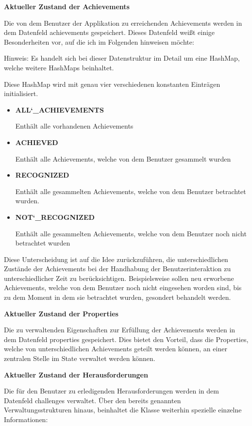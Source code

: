 \documentclass[bibliography=totoc,listof=totoc,BCOR=5mm,DIV=12,oneside]{scrbook}
\begin{document}
\newpage
\par \bigskip \textbf{Aktueller Zustand der Achievements}
\par Die von dem Benutzer der Applikation zu erreichenden Achievements werden in dem Datenfeld achievements gespeichert. Dieses Datenfeld weißt einige Besonderheiten vor, auf die ich im Folgenden hinweisen möchte:
\par \medskip Hinweis: Es handelt sich bei dieser Datenstruktur im Detail um eine HashMap, welche weitere HashMaps beinhaltet. 
\par \medskip Diese HashMap wird mit genau vier verschiedenen konstanten Einträgen initialisiert.
\begin{itemize}
\item \textbf{ALL\char`_ACHIEVEMENTS}
\par Enthält alle vorhandenen Achievements
\item \textbf{ACHIEVED}
\par Enthält alle Achievements, welche von dem Benutzer gesammelt wurden
\item \textbf{RECOGNIZED}
\par Enthält alle gesammelten Achievements, welche von dem Benutzer betrachtet wurden.
\item \textbf{NOT\char`_RECOGNIZED}
\par Enthält alle gesammelten Achievements, welche von dem Benutzer noch nicht betrachtet wurden
\end{itemize}

\par Diese Unterscheidung ist auf die Idee zurückzuführen, die unterschiedlichen Zustände der Achievements bei der Handhabung der Benutzerinteraktion zu unterschiedlicher Zeit zu berücksichtigen. Beispielsweise sollen neu erworbene Achievements, welche von dem Benutzer noch nicht eingesehen worden sind, bis zu dem Moment in dem sie betrachtet wurden, gesondert behandelt werden.

\par \bigskip \textbf{Aktueller Zustand der Properties}
\par Die zu verwaltenden Eigenschaften zur Erfüllung der Achievements werden in dem Datenfeld properties gespeichert. Dies bietet den Vorteil, dass die Properties, welche von unterschiedlichen Achievements geteilt werden können, an einer zentralen Stelle im State verwaltet werden können.

\par \bigskip \textbf{Aktueller Zustand der Herausforderungen}
\par Die für den Benutzer zu erledigenden Herausforderungen werden in dem Datenfeld challenges verwaltet.
Über den bereits genannten Verwaltungsstrukturen hinaus, beinhaltet die Klasse weiterhin spezielle einzelne Informationen:
\end{document}

